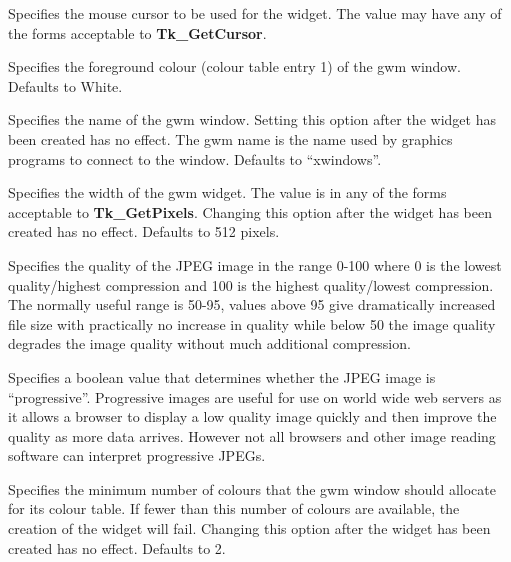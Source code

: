 \begin{rquote}
Specifies the mouse cursor to be used for the widget.
The value may have any of the forms acceptable to {\bf Tk\_GetCursor}.
\end{rquote}

\begin{rquote}
Specifies the foreground colour (colour table entry 1) of the gwm window.
Defaults to White.
\end{rquote}

\begin{rquote}
Specifies the name of the gwm window. Setting
this option after the widget has been created has no effect. The gwm name
is the name used by graphics programs to connect to the window. Defaults
to ``xwindows''.
\end{rquote}

\begin{rquote}
Specifies the width of the gwm widget. The value is in any of the forms
acceptable to {\bf Tk\_GetPixels}. Changing this option after the widget
has been created has no effect. Defaults to 512 pixels.
\end{rquote}

\begin{rquote}
Specifies the quality of the JPEG image in the range 0-100 where 0 is the
lowest quality/highest compression and 100 is the highest quality/lowest
compression. The normally useful range is 50-95, values above 95 give
dramatically increased file size with practically no increase in quality
while below 50 the image quality degrades the image quality without much
additional compression.
\end{rquote}

\begin{rquote}
Specifies a boolean value that determines whether the JPEG image is
``progressive''. Progressive images are useful for use on world wide web
servers as it allows a browser to display a low quality image quickly and
then improve the quality as more data arrives. However not all browsers
and other image reading software can interpret progressive JPEGs.
\end{rquote}

\begin{rquote}
Specifies the minimum number of colours that the gwm window should allocate
for its colour table. If fewer than this number of colours are available,
the creation of the widget will fail. Changing this option after the widget
has been created has no effect. Defaults to 2.
\end{rquote}

